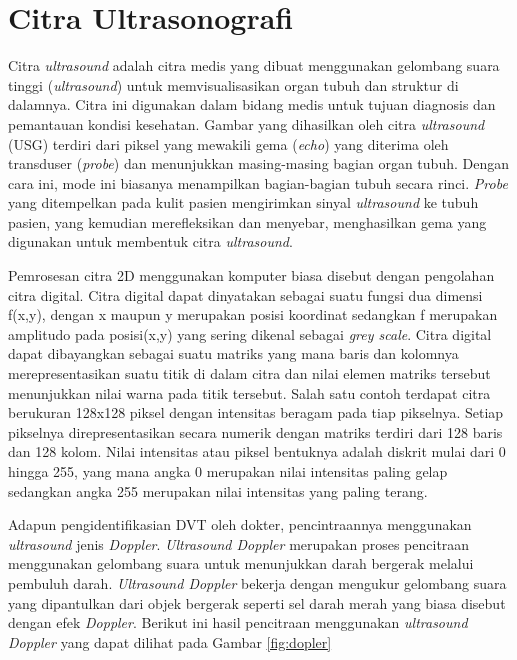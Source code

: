 \section{Citra Ultrasonografi}
Citra \textit{ultrasound} adalah citra medis yang dibuat menggunakan gelombang suara tinggi (\textit{ultrasound}) untuk memvisualisasikan organ tubuh dan struktur di dalamnya\cite{MIT2022}. Citra ini digunakan dalam bidang medis untuk tujuan diagnosis dan pemantauan kondisi kesehatan. Gambar yang dihasilkan oleh citra \textit{ultrasound} (USG) terdiri dari piksel yang mewakili gema (\textit{echo}) yang diterima oleh transduser (\textit{probe}) dan menunjukkan masing-masing bagian organ tubuh\cite{cloutier2021quantitative}. Dengan cara ini, mode ini biasanya menampilkan bagian-bagian tubuh secara rinci. \textit{Probe} yang ditempelkan pada kulit pasien mengirimkan sinyal \textit{ultrasound} ke tubuh pasien, yang kemudian merefleksikan dan menyebar, menghasilkan gema yang digunakan untuk membentuk citra \textit{ultrasound}. 

Pemrosesan citra 2D menggunakan komputer biasa disebut dengan pengolahan citra digital. Citra digital dapat dinyatakan sebagai suatu fungsi dua dimensi f(x,y), dengan x maupun y merupakan posisi koordinat sedangkan f merupakan amplitudo pada posisi(x,y) yang sering dikenal sebagai \textit{grey scale}\cite{Purnomo2010}. Citra digital dapat dibayangkan sebagai suatu matriks yang mana baris dan kolomnya merepresentasikan suatu titik di dalam citra dan nilai elemen matriks tersebut menunjukkan nilai warna pada titik tersebut. Salah satu contoh terdapat citra berukuran 128x128 piksel dengan intensitas beragam pada tiap pikselnya. Setiap pikselnya direpresentasikan secara numerik dengan matriks terdiri dari 128 baris dan 128 kolom. Nilai intensitas atau piksel bentuknya adalah diskrit mulai dari 0 hingga 255, yang mana angka 0 merupakan nilai intensitas paling gelap sedangkan angka 255 merupakan nilai intensitas yang paling terang. 

Adapun pengidentifikasian DVT oleh dokter, pencintraannya menggunakan \textit{ultrasound} jenis \textit{Doppler}. \textit{Ultrasound Doppler} merupakan proses pencitraan menggunakan gelombang suara untuk menunjukkan darah bergerak melalui pembuluh darah\cite{shah2022sonography}. \textit{Ultrasound Doppler} bekerja dengan mengukur gelombang suara yang dipantulkan dari objek bergerak seperti sel darah merah yang biasa disebut dengan efek \textit{Doppler}. Berikut ini hasil pencitraan menggunakan \textit{ultrasound Doppler} yang dapat dilihat pada Gambar \ref{fig:dopler}



